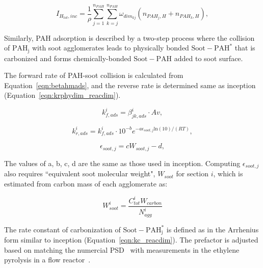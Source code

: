 \begin{equation}
	I_{H_{tot},{inc}} = 
	\frac{1}{\rho}
	\sum_{j=1}^{n_{PAH}} \sum_{k=j}^{n_{PAH}}  \omega_{dim_{kj}} 
	\left(
	n_{PAH_j,H}+n_{PAH_k,H}
	\right)
	\label{eqn:IHtot_inc},
\end{equation}

Similarly, PAH adsorption is described by a two-step process where the collision of $\mathrm{PAH_j}$ with soot agglomerates leads to physically bonded $\mathrm{Soot-PAH^*}$ that is carbonized and forms chemically-bonded $\mathrm{Soot-PAH}$ added to soot surface.



The forward rate of PAH-soot collision is calculated from Equation~\eqref{eqn:betahmads}, and the reverse rate is determined same as inception (Equation~\eqref{eqn:krphydim_reacdim}).

\begin{equation}
	k^i_{f,ads}=\beta^i_{jk,ads}\cdot Av
	\label{eqn:kfads_reacdim},
\end{equation}

\begin{equation}
	k^i_{r,ads}=k^i_{f,ads}\cdot10^{-b}e^{-a\epsilon_{soot,j} \mathrm{ln}(10)/(RT)}
	\label{eqn:krads_reacdim},
\end{equation}

\begin{equation}
	\epsilon_{soot,j} = cW_{soot,j} -d
	\label{eqn:epsilonads_reacdim},
\end{equation}

The values of a, b, c, d are the same as those used in inception. Computing ${\epsilon_{soot,j}}$ also requires ``equivalent soot molecular weight", ${W_{soot}}$ for section $i$, which is estimated from carbon mass of each agglomerate as:

\begin{equation}
	W^i_{soot}=\frac{C^i_{tot}W_{carbon}}{N^i_{agg}} 
\end{equation}

The rate constant of carbonization of $\mathrm{Soot-PAH^*_j}$ is defined as in the Arrhenius form similar to inception (Equation~\eqref{eqn:kc_reacdim}). The prefactor is adjusted based on matching the numercial PSD~\citep{naseri2022simulating} with measurements in the ethylene pyrolysis in a flow reactor~\cite{araki2021effects}. 

